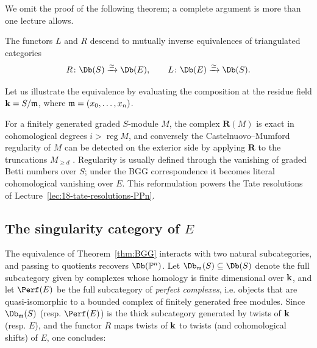 \documentclass{amsart}
\begin{document}
We omit the proof of the following theorem; a complete argument is more than one lecture allows. 


\begin{thm}\label{thm:BGG}
  The functors $L$ and $R$ descend to mutually inverse equivalences of triangulated categories
  \[  R\colon \Db(S)\xto{\simeq}\Db(E), \qquad L\colon \Db(E)\xto{\simeq}\Db(S). \]
\end{thm}



Let us illustrate the equivalence by evaluating the composition at the residue field ${\bf k} = S/\mathfrak m$, where $\mathfrak m = (x_0,\dots,x_n)$.

\begin{remark}\label{rem:BGGregularity}
  For a finitely generated graded $S$-module $M$, the complex $\mathbf R(M)$ is exact in cohomological degrees $i > \operatorname{reg} M$, and conversely the Castelnuovo--Mumford regularity of $M$ can be detected on the exterior side by applying $\mathbf R$ to the truncations $M_{\ge d}$ \cite[\S2]{EFS03}. Regularity is usually defined through the vanishing of graded Betti numbers over $S$; under the BGG correspondence it becomes literal cohomological vanishing over $E$. This reformulation powers the Tate resolutions of Lecture~\ref{lec:18-tate-resolutions-PPn}.
\end{remark}

\subsection{The singularity category of $E$}

The equivalence of Theorem~\ref{thm:BGG} interacts with two natural subcategories, and passing to quotients recovers $\Db(\PP^n)$. Let $\Db_\m(S)\subseteq \Db(S)$ denote the full subcategory given by complexes whose homology is finite dimensional over ${\bf k}$, and let $\Perf(E)$ be the full subcategory of \emph{perfect complexes}, i.e. objects that are quasi-isomorphic to a bounded complex of finitely generated free modules. Since $\Db_\m(S)$ (resp. $\Perf(E)$) is the thick subcategory generated by twists of ${\bf k}$ (resp. $E$), and the functor $R$ maps twists of ${\bf k}$ to twists (and cohomological shifts) of $E$, one concludes:
\end{document}
